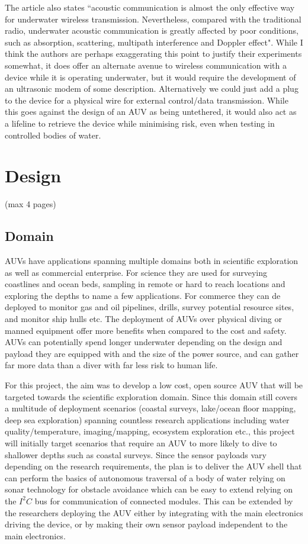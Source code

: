 \documentclass[11pt,a4paper,titlepage]{report}
\begin{document}
	The article also states ``acoustic communication is almost the only effective way for underwater wireless transmission. Nevertheless, compared with the traditional radio, underwater acoustic communication is greatly affected by poor conditions, such as absorption, scattering, multipath interference and Doppler effect"\cite{UNDERWATER_RADIO}. While I think the authors are perhaps exaggerating this point to justify their experiments somewhat, it does offer an alternate avenue to wireless communication with a device while it is operating underwater, but it would require the development of an ultrasonic modem of some description. Alternatively we could just add a plug to the device for a physical wire for external control/data transmission. While this goes against the design of an AUV as being untethered, it would also act as a lifeline to retrieve the device while minimising risk, even when testing in controlled bodies of water.
	
	\chapter*{Design} (max 4 pages)
	\section*{Domain}
	AUVs have applications spanning multiple domains both in scientific exploration as well as commercial enterprise. For science they are used for surveying coastlines and ocean beds, sampling in remote or hard to reach locations and exploring the depths to name a few applications. For commerce they can de deployed to monitor gas and oil pipelines, drills, survey potential resource sites, and monitor ship hulls etc. The deployment of AUVs over physical diving or manned equipment offer more benefits when compared to the cost and safety. AUVs can potentially spend longer underwater depending on the design and payload they are equipped with and the size of the power source, and can gather far more data than a diver with far less risk to human life.
	
	For this project, the aim was to develop a low cost, open source AUV that will be targeted towards the scientific exploration domain. Since this domain still covers a multitude of deployment scenarios (coastal surveys, lake/ocean floor mapping, deep sea exploration) spanning countless research applications including water quality/temperature, imaging/mapping, ecosystem exploration etc., this project will initially target scenarios that require an AUV to more likely to dive to shallower depths such as coastal surveys. Since the sensor payloads vary depending on the research requirements, the plan is to deliver the AUV shell that can perform the basics of autonomous traversal of a body of water relying on sonar technology for obstacle avoidance which can be easy to extend relying on the $I^{2}C$ bus for communication of connected modules. This can be extended by the researchers deploying the AUV either by integrating with the main electronics driving the device, or by making their own sensor payload independent to the main electronics. 
	
\end{document}

